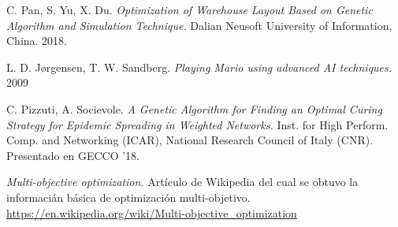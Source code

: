 
\begin{thebibliography}{9}
C. Pan, S. Yu, X. Du.
\textit{Optimization of Warehouse Layout Based on Genetic Algorithm and Simulation Technique.}
Dalian Neusoft University of Information, China. 2018.

L. D. Jørgensen, T. W. Sandberg.
\textit{Playing Mario using advanced AI techniques.}
2009

C. Pizzuti, A. Socievole.
\textit{A Genetic Algorithm for Finding an Optimal Curing Strategy for Epidemic Spreading in Weighted Networks.}
Inst. for High Perform. Comp. and Networking (ICAR), National Research Council of Italy (CNR). Presentado en GECCO ’18.

\textit{Multi-objective optimization.}
Artículo de Wikipedia del cual se obtuvo la informacián básica de optimización multi-objetivo.\\
\url{https://en.wikipedia.org/wiki/Multi-objective_optimization}

\end{thebibliography}
